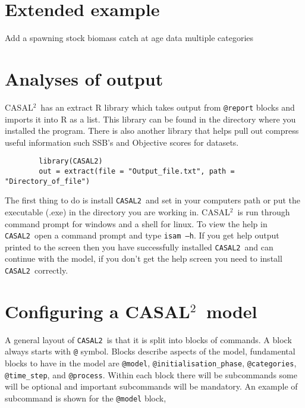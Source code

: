 \documentclass[12pt]{article}
\makeatletter
\newcommand{\cas}{\texttt{CASAL2}}
\newcommand{\CAS}{CASAL$^2$}
\newcommand{\command}[1] {\texttt{@#1}}
\makeatother
\begin{document}
\section{Extended example}\label{Sec:exte}
Add a spawning stock biomass
catch at age data
multiple categories

\section{Analyses of output}\label{Sec:output}
\CAS\ has an extract R library which takes output from \command{report} blocks and imports it into R as a list. This library can be found in the directory where you installed the program. There is also another library that helps pull out compress useful information such SSB's and Objective scores for datasets. 
{\small{\begin{verbatim}
		library(CASAL2)
		out = extract(file = "Output_file.txt", path = "Directory_of_file")
		\end{verbatim}}}






The first thing to do is install \cas\ and set in your computers path or put the executable (.exe) in the directory you are working in. \CAS\ is run through command prompt for windows and a shell for linux. To view the help in \cas\ open a command prompt and type \texttt{isam --h}. If you get help output printed to the screen then you have successfully installed \cas\ and can continue with the model, if you don't get the help screen you need to install \cas\ correctly. 
 


\section{Configuring a \CAS\ model}
A general layout of \cas\ is that it is split into blocks of commands. A block always starts with \command{} symbol. Blocks describe aspects of the model, fundamental blocks to have in the model are \command{model}, \command{initialisation\_phase}, \command{categories}, \command{time\_step}, and \command{process}. Within each block there will be subcommands some will be optional and important subcommands will be mandatory. An example of subcommand is shown for the \command{model} block,
\end{document}

